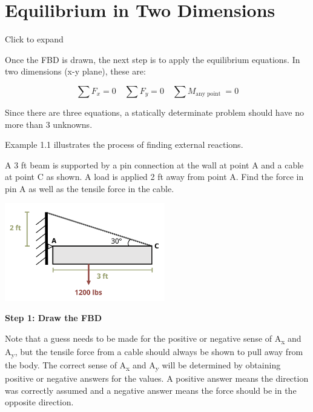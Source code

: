 \documentclass[
  letterpaper,
  DIV=11,
  numbers=noendperiod]{scrreprt}
\begin{document}
\section{Equilibrium in Two
Dimensions}\label{equilibrium-in-two-dimensions}

Click to expand

Once the FBD is drawn, the next step is to apply the equilibrium
equations. In two dimensions (x-y plane), these are:

\[
\sum F_x=0 \quad \sum F_y=0 \quad \sum M_{\text {any point }}=0
\]

Since there are three equations, a statically determinate problem should
have no more than 3 unknowns.

Example 1.1 illustrates the process of finding external reactions.

\begin{tcolorbox}[enhanced jigsaw, colback=white, colframe=quarto-callout-note-color-frame, leftrule=.75mm, opacitybacktitle=0.6, colbacktitle=quarto-callout-note-color!10!white, arc=.35mm, bottomrule=.15mm, breakable, title=\textcolor{quarto-callout-note-color}{\faInfo}\hspace{0.5em}{Example 1.1}, left=2mm, titlerule=0mm, toptitle=1mm, toprule=.15mm, opacityback=0, rightrule=.15mm, coltitle=black, bottomtitle=1mm]

A 3 ft beam is supported by a pin connection at the wall at point A and
a cable at point C as shown. A load is applied 2 ft away from point A.
Find the force in pin A as well as the tensile force in the cable.

\begin{center}
\includegraphics[width=2.75in,height=\textheight]{images/CH1 PNGs/example 1.1 part 1.png}
\end{center}

\textbf{Step 1: Draw the FBD}

Note that a guess needs to be made for the positive or negative sense of
A\textsubscript{x} and A\textsubscript{y}, but the tensile force from a
cable should always be shown to pull away from the body. The correct
sense of A\textsubscript{x} and A\textsubscript{y} will be determined by
obtaining positive or negative answers for the values. A positive answer
means the direction was correctly assumed and a negative answer means
the force should be in the opposite direction.


\end{tcolorbox}
\end{document}
